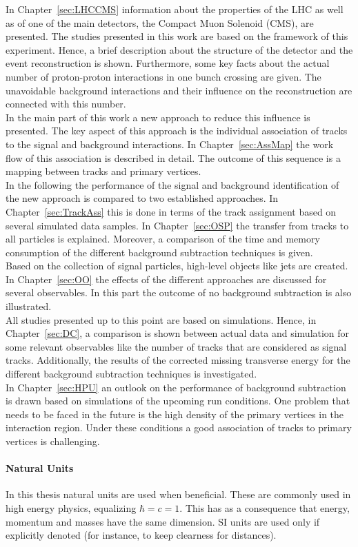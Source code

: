 In Chapter~\ref{sec:LHCCMS} information about the properties of the LHC as well as of one of the main detectors, the Compact Muon Solenoid (CMS), are presented. The studies presented in this work are based on the framework of this experiment. Hence, a brief description about the structure of the detector and the event reconstruction is shown. Furthermore, some key facts about the actual number of proton-proton interactions in one bunch crossing are given. The unavoidable background interactions and their influence on the reconstruction are connected with this number. \\
In the main part of this work a new approach to reduce this influence is presented. The key aspect of this approach is the individual association of tracks to the signal and background interactions. In Chapter~\ref{sec:AssMap} the work flow of this association is described in detail. The outcome of this sequence is a mapping between tracks and primary vertices. \\
In the following the performance of the signal and background identification of the new approach is compared to two established approaches. In Chapter~\ref{sec:TrackAss} this is done in terms of the track assignment based on several simulated data samples. In Chapter~\ref{sec:OSP} the transfer from tracks to all particles is explained. Moreover, a comparison of the time and memory consumption of the different background subtraction techniques is given. \\
Based on the collection of signal particles, high-level objects like jets are created. In Chapter~\ref{sec:OO} the effects of the different approaches are discussed for several observables. In this part the outcome of no background subtraction is also illustrated. \\
All studies presented up to this point are based on simulations. Hence, in Chapter~\ref{sec:DC}, a comparison is shown between actual data and simulation for some relevant observables like the number of tracks that are considered as signal tracks. Additionally, the results of the corrected missing transverse energy for the different background subtraction techniques is investigated. \\
In Chapter~\ref{sec:HPU} an outlook on the performance of background subtraction is drawn based on simulations of the upcoming run conditions. One problem that needs to be faced in the future is the high density of the primary vertices in the interaction region. Under these conditions a good association of tracks to primary vertices is challenging.

\paragraph*{Natural Units}

In this thesis natural units are used when beneficial. These are commonly used in high energy physics, equalizing $\hbar{} = c = 1$. This has as a consequence that energy, momentum and masses have the same dimension. SI units are used only if explicitly denoted (for instance, to keep clearness for distances).
